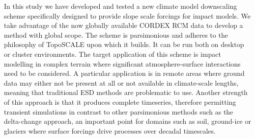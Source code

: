 \documentclass[hess, manuscript]{copernicus}
\begin{document}







\conclusions  %
In this study we have developed and tested a new climate model downscaling scheme specifically designed to provide slope scale forcings for impact models. We take advantage of the now globally available CORDEX RCM data to develop a method with global scope. The scheme is parsimonious and adheres to the philosophy of TopoSCALE upon which it builds. It can be run both on desktop or cluster environments. The target application of this scheme is impact modelling in complex terrain where significant atmosphere-surface interactions need to be considered. A particular application is in remote areas where ground data may either not be present at all or not available in climate-scale lengths, meaning that traditional ESD methods are problematic to use. Another strength of this approach is that it produces complete timeseries, therefore permitting transient simulations in contrast to other parsimonious methods such as the delta-change approach, an important point for domains such as soil, ground-ice or glaciers  where surface forcings drive processes over decadal timescales. 




\end{document}
